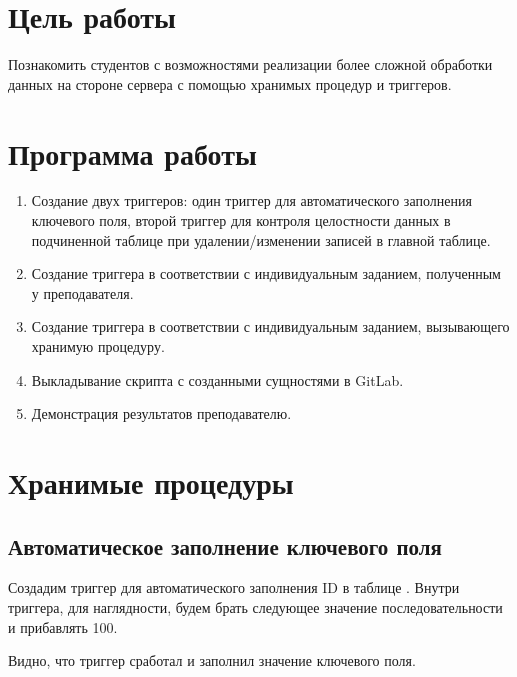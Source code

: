 





\tableofcontents
\newpage

\section{Цель работы}

Познакомить студентов с возможностями реализации более сложной обработки данных на стороне сервера с помощью хранимых процедур и триггеров.

\section{Программа работы}

\begin{enumerate}
	\item Создание двух триггеров: один триггер для автоматического заполнения ключевого поля, второй триггер для контроля целостности данных в подчиненной таблице при удалении/изменении записей в главной таблице.
	\item Создание триггера в соответствии с индивидуальным заданием, полученным у преподавателя.
	\item Создание триггера в соответствии с индивидуальным заданием, вызывающего хранимую процедуру.
	\item Выкладывание скрипта с созданными сущностями в GitLab.
	\item Демонстрация результатов преподавателю.
\end{enumerate}

\section{Хранимые процедуры}

\subsection{Автоматическое заполнение ключевого поля}

Создадим триггер для автоматического заполнения ID в таблице . Внутри триггера, для наглядности, будем брать следующее значение последовательности  и прибавлять 100.



Видно, что триггер сработал и заполнил значение ключевого поля.

